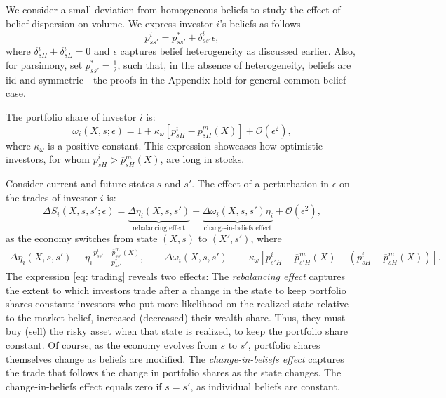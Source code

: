 We consider a small deviation from homogeneous beliefs to study the effect of belief dispersion on volume. We express investor $i$'s beliefs as follows
\begin{equation}
    p_{ss'}^i = p_{ss'}^* + \delta_{ss'}^i \epsilon,\nonumber
\end{equation}
where $\delta_{sH}^i + \delta_{sL}^i = 0$ and $\epsilon$ captures belief heterogeneity as discussed earlier. Also, for parsimony, set $p_{ss'}^* = \frac{1}{2}$, such that, in the absence of heterogeneity, beliefs are iid and symmetric---the proofs in the Appendix hold for general common belief case.

The portfolio share of investor $i$ is:
\begin{equation}
    \omega_{i}(X,s; \epsilon) = 1 +\kappa_\omega \left[p_{sH}^i - \overline{p}^m_{sH}(X)\right] + \mathcal{O}(\epsilon^2),\nonumber
\end{equation}
where $\kappa_\omega$ is a positive constant. This expression showcases how optimistic investors, for whom $p_{sH}^i > \overline{p}^m_{sH}(X)$, are long in stocks. 

Consider current and future states $s$ and $s'$. The effect of a perturbation in $\epsilon$ on the trades of investor $i$ is:
\begin{equation}\label{eq: trading}
    \Delta S_i(X,s,s';\epsilon) =
    \underbrace{\Delta \eta_i(X,s,s')}_{\text{rebalancing effect}}+\underbrace{\Delta \omega_i(X,s,s') \eta_i}_{\text{change-in-beliefs effect}} + \mathcal{O}(\epsilon^2),
\end{equation}
as the economy switches from state $(X,s)$ to $(X',s')$, where 
\begin{align}
    \Delta \eta_i(X,s,s') \equiv \eta_i \frac{p_{ss'}^i - \overline{p}_{ss'}^m(X)}{p_{ss'}^*} , \qquad
    \Delta \omega_i(X,s,s') &\equiv \kappa_\omega\left[p_{s'H}^i - \overline{p}_{s'H}^m(X) - (p_{sH}^i - \overline{p}^m_{sH}(X)) \right] .\nonumber
\end{align}
The expression \eqref{eq: trading} reveals two effects: The \textit{rebalancing effect} captures the extent to which investors trade after a change in the state to keep portfolio shares constant: investors who put more likelihood on the realized state relative to the market belief, increased (decreased) their wealth share. Thus, they must buy (sell) the risky asset when that state is realized, to keep the portfolio share constant. Of course, as the economy evolves from $s$ to $s'$, portfolio shares themselves change as beliefs are modified. The \textit{change-in-beliefs effect} captures the trade that follows the change in portfolio shares as the state changes. The change-in-beliefs effect equals zero if $s = s'$, as individual beliefs are constant.  

